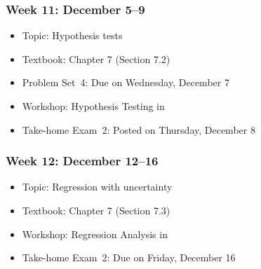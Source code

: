 \documentclass[11pt]{article}
\begin{document}
\subsubsection*{\sc Week 11: December 5--9}

\begin{itemize}

\item {\sc Topic}: Hypothesis tests
\item {\sc Textbook}: Chapter 7 (Section 7.2)
\item {\sc Problem Set~4}: Due on Wednesday, December 7
\item {\sc Workshop}: Hypothesis Testing in \R
\item {\sc Take-home Exam~2}: Posted on Thursday, December 8
\end{itemize}


\subsubsection*{\sc Week 12: December 12--16}


\begin{itemize}
\item {\sc Topic}: Regression with uncertainty
\item {\sc Textbook}: Chapter 7 (Section 7.3)
\item {\sc Workshop}: Regression Analysis in \R
\item {\sc Take-home Exam~2}: Due on Friday, December 16
\end{itemize}
\end{document}
